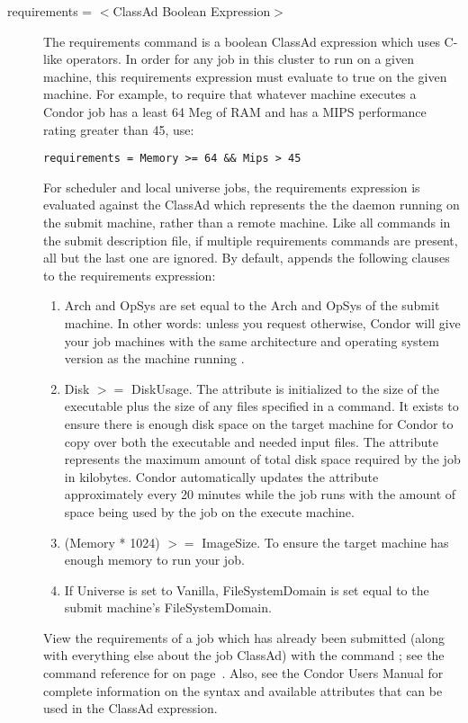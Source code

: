 \begin{description}
\item[requirements = $<$ClassAd Boolean Expression$>$]
The requirements
command is a boolean ClassAd expression which uses C-like operators. In
order for any job in this cluster to run on a given machine, this
requirements expression must evaluate to true on the given machine. For
example, to require that whatever machine executes a Condor job has a
least 64 Meg of RAM and has a MIPS performance rating greater than 45,
use:
\begin{verbatim}
requirements = Memory >= 64 && Mips > 45
\end{verbatim}
For scheduler and local universe jobs, the requirements expression is
evaluated against
the  ClassAd which represents the 
the  daemon running on the submit machine,
rather than a remote machine.
Like all commands in the submit description file, if multiple requirements
commands are present, all but the last one are ignored.
By default,  appends the following clauses to
the requirements expression:
\begin{enumerate}
        \item Arch and OpSys are set equal to the Arch and OpSys of the
submit machine.  In other words: unless you request otherwise, Condor will give your
job machines with the same architecture and operating system version as
the machine running .
        \item Disk $>=$ DiskUsage.
The  attribute is initialized to the size of the
executable plus the size of any files specified in a
 command.
It exists to ensure there is enough disk space on the
target machine for Condor to copy over both the executable
and needed input files.
The  attribute represents the maximum amount of
total disk space required by the job in kilobytes.
Condor automatically updates the  attribute
approximately every 20 minutes while the job runs with the
amount of space being used by the job on the execute machine.
        \item (Memory * 1024) $>=$ ImageSize.  To ensure the target machine
has enough memory to run your job.
        \item If Universe is set to Vanilla, FileSystemDomain is set equal to
the submit machine's FileSystemDomain.
\end{enumerate}
View the requirements of a job
which has already been submitted (along with everything else about the
job ClassAd) with the command ; see the command reference for
 on page~\pageref{man-condor-q}.  Also, see the Condor Users
Manual for complete information on the syntax and available attributes
that can be used in the ClassAd expression.


\end{description} 

